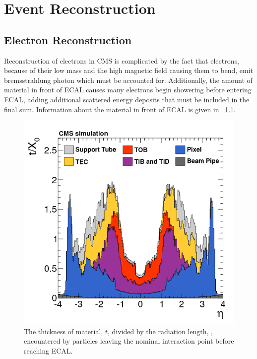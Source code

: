 \chapter{Event Reconstruction}
\label{reconstruction_chapter}

\section{Electron Reconstruction}

Reconstruction of electrons in CMS is complicated by the fact that electrons,
because of their low mass and the high magnetic field causing them to bend,
emit bremsstrahlung photon which must be accounted for. Additionally, the
amount of material in front of ECAL causes many electrons begin showering
before entering ECAL, adding additional scattered energy deposits that must be
included in the final sum. Information about the material in front of ECAL is
given in \FIG~\ref{fig:tracker_material}\cite{cms_tracker_2014}.

\begin{figure}[tb]
    \centering
    \includegraphics[width=\textwidth]{figures/tracker_material_budget.png}
    \caption{
        The thickness of material, $t$, divided by the radiation length,
        \radiationlength, encountered by particles leaving the nominal
        interaction point before reaching ECAL.
    }
    \label{fig:tracker_material}
\end{figure}

